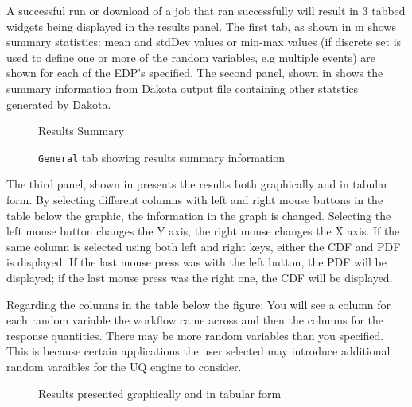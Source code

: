 A successful run or download of a job that ran successfully will result in 3 tabbed
widgets being displayed in the results panel.  The first tab, as shown in
m shows summary statistics: mean and
stdDev values or min-max values (if discrete set is used to define one or more of the random variables, e.g multiple events)
are shown for each of the EDP's specified. The second panel,
shown in  shows the summary
information from Dakota output file containing other statstics generated by Dakota.

\begin{figure}[!htbp]
  \caption{Results Summary}
  \label{fig:results_summary}
\end{figure}

\begin{figure}[!htbp]
  \caption{\texttt{General} tab showing results summary information}
  \label{fig:summary_information}
\end{figure}

The third panel, shown in  presents the results both
graphically and in tabular form. By selecting different
columns with left and right mouse buttons in the table below the
graphic, the information in the graph is changed. Selecting the left
mouse button changes the Y axis, the right mouse changes the X
axis. If the same column is selected using both left and right keys,
either the CDF and PDF is displayed. If the last mouse press was with the left
button, the PDF will be displayed; if the last mouse press was the right one, the CDF
will be displayed.
 
Regarding the columns in the table below the figure: You will see a column for each random variable the workflow came across and then the columns for the response quantities. There may be more random variables than you specified. This is because certain applications the user selected may introduce additional random varaibles for the UQ engine to consider. 

\begin{figure}[!htbp]
  \caption{Results presented graphically and in tabular form}
  \label{fig:results_data}
\end{figure}
